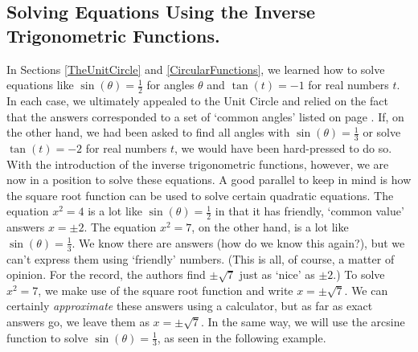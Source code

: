 \medskip

\subsection{Solving Equations Using the Inverse Trigonometric Functions.}

In Sections \ref{TheUnitCircle} and \ref{CircularFunctions}, we learned how to solve equations like $\sin(\theta) = \frac{1}{2}$ for angles $\theta$ and $\tan(t) = -1$ for real numbers $t$. In each case, we ultimately appealed to the Unit Circle and relied on the fact that the answers corresponded to a set of `common angles' listed on page \pageref{commonanglesunitcircle}.  If, on the other hand, we had been asked to find all angles with $\sin(\theta) = \frac{1}{3}$ or solve $\tan(t) = -2$ for real numbers $t$, we would have been hard-pressed to do so.  With the introduction of the inverse trigonometric functions, however, we are now in a position to solve these equations. A good parallel to keep in mind is how the square root function can be used to solve certain quadratic equations.  The equation $x^2 = 4$ is a lot like  $\sin(\theta) = \frac{1}{2}$ in that it has friendly, `common value' answers  $x = \pm 2$.  The equation $x^2 = 7$, on the other hand, is a lot like $\sin(\theta) = \frac{1}{3}$.  We know there are answers (how do we know this again?), but we can't express them using `friendly' numbers. (This is all, of course, a matter of opinion.  For the record, the authors find $\pm \sqrt{7}$ just as `nice' as $\pm 2$.)  To solve $x^2 = 7$, we make use of the square root function and write $x = \pm \sqrt{7}$. We can certainly \textit{approximate} these answers using a calculator, but as far as exact answers go, we leave them as $x = \pm \sqrt{7}$.  In the same way, we will use the arcsine function to solve $\sin(\theta) = \frac{1}{3}$, as seen in the following example.

\pagebreak

